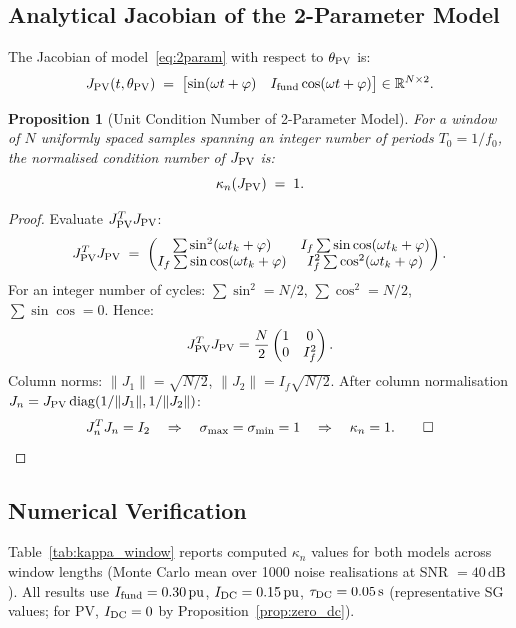 \documentclass[11pt, a4paper]{article}
\newtheorem{proposition}{Proposition}
\newcommand{\pu}{\,\text{pu}}
\newcommand{\kn}{\kappa_n}
\newcommand{\thpv}{\theta_{\rm PV}}
\begin{document}
\subsection{Analytical Jacobian of the 2-Parameter Model}

The Jacobian of model~\eqref{eq:2param} with respect to $\thpv$ is:
\begin{equation}
  J_{\rm PV}(t,\thpv) \;=\;
  \begin{bmatrix}
    \sin(\omega t + \varphi) & I_{\rm fund}\cos(\omega t + \varphi)
  \end{bmatrix}
  \in \mathbb{R}^{N \times 2}.
  \label{eq:jac_pv}
\end{equation}

\begin{proposition}[Unit Condition Number of 2-Parameter Model]
\label{prop:kappa}
For a window of $N$ uniformly spaced samples spanning an integer number of
periods $T_0 = 1/f_0$, the normalised condition number of $J_{\rm PV}$ is:
\begin{equation}
  \kappa_n(J_{\rm PV}) \;=\; 1.
  \label{eq:kappa_1}
\end{equation}
\end{proposition}
\begin{proof}
Evaluate $J_{\rm PV}^T J_{\rm PV}$:
\[
  J_{\rm PV}^T J_{\rm PV} \;=\;
  \begin{pmatrix}
    \sum \sin^2(\omega t_k + \varphi) & I_f \sum \sin\cos(\omega t_k+\varphi) \\
    I_f \sum \sin\cos(\omega t_k+\varphi) & I_f^2 \sum\cos^2(\omega t_k+\varphi)
  \end{pmatrix}.
\]
For an integer number of cycles: $\sum\sin^2 = N/2$,
$\sum\cos^2 = N/2$, $\sum\sin\cos = 0$.  Hence:
\[
  J_{\rm PV}^T J_{\rm PV} = \frac{N}{2}\begin{pmatrix}1 & 0\\ 0 & I_f^2\end{pmatrix}.
\]
Column norms: $\|J_1\| = \sqrt{N/2}$, $\|J_2\| = I_f\sqrt{N/2}$.
After column normalisation $J_n = J_{\rm PV}\,{\rm diag}(1/\|J_1\|, 1/\|J_2\|)$:
\[
  J_n^T J_n = I_2 \quad\Rightarrow\quad \sigma_{\max} = \sigma_{\min} = 1
  \quad\Rightarrow\quad \kn = 1.  \qed
\]
\end{proof}

\subsection{Numerical Verification}

Table~\ref{tab:kappa_window} reports computed $\kn$ values for both models
across window lengths (Monte Carlo mean over 1000 noise realisations at SNR
$= 40\,\text{dB}$).  All results use $I_{\rm fund} = 0.30\pu$, $I_{\rm DC} = 0.15\pu$,
$\tau_{\rm DC} = 0.05\,\text{s}$ (representative SG values; for PV, $I_{\rm DC}=0$
by Proposition~\ref{prop:zero_dc}).
\end{document}
